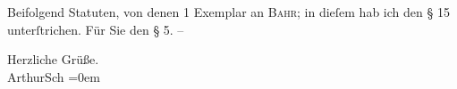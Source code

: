 \pstart
           {\pb}Beifolgend Statuten, von denen 1 Exemplar an \textsc{Bahr}; in dieſem hab ich den § 15 unterſtrichen. Für Sie den § 5. –\pend
           
\pstart
           Herzliche Grüße.{\\[\baselineskip]}\spacefill\mbox{ArthurSch}\pend
           \leftskip=0em{}\endnumbering{}  \newcommand{\dateiname}{L00309}\newcommand{\titel}{Arthur Schnitzler an Richard Beer-Hofmann, [2. 4. 1894?]}\newcommand{\editorInnen}{Herausgegeben von Martin Anton Müller}
